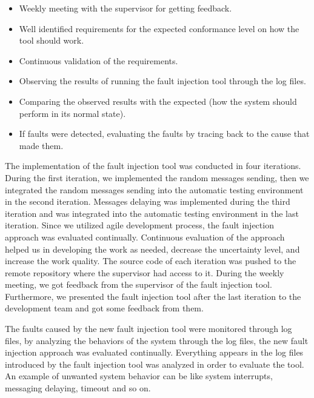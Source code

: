 \begin{itemize}
    \item Weekly meeting with the supervisor for getting feedback.
    \item Well identified requirements for the expected conformance level on how the tool should work.
    \item Continuous validation of the requirements.
    \item Observing the results of running the fault injection tool through the log files.
    \item Comparing the observed results with the expected (how the system should perform in its normal state). 
    \item If faults were detected, evaluating the faults by tracing back to the cause that made them.
\end{itemize}

The implementation of the fault injection tool was conducted in four iterations. During the first iteration, we implemented the random messages sending, then we integrated the random messages sending into the automatic testing environment in the second iteration. Messages delaying was implemented during the third iteration and was integrated into the automatic testing environment in the last iteration. Since we utilized agile development process, the fault injection approach was evaluated continually. Continuous evaluation of the approach helped us in developing the work as needed, decrease the uncertainty level, and increase the work quality. The source code of each iteration was pushed to the remote repository where the supervisor had access to it. During the weekly meeting, we got feedback from the supervisor of the fault injection tool. Furthermore, we presented the fault injection tool after the last iteration to the development team and got some feedback from them. 

The faults caused by the new fault injection tool were monitored through log files, by analyzing the behaviors of the system through the log files, the new fault injection approach was evaluated continually. Everything appears in the log files introduced by the fault injection tool was analyzed in order to evaluate the tool. An example of unwanted system behavior can be like system interrupts, messaging delaying, timeout and so on.

